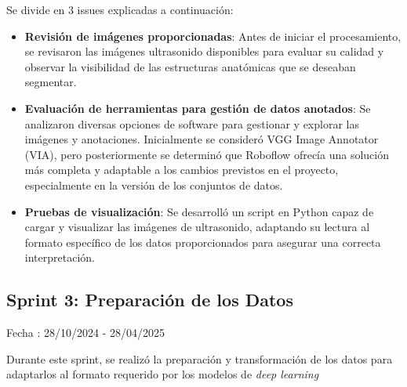 Se divide en 3 issues explicadas a continuación:
\begin{itemize}
    \item \textbf{Revisión de imágenes proporcionadas}: Antes de iniciar el procesamiento, se revisaron las imágenes ultrasonido disponibles para evaluar su calidad y observar la visibilidad de las estructuras anatómicas que se deseaban segmentar.
    \item \textbf{Evaluación de herramientas para gestión de datos anotados}: Se analizaron diversas opciones de software para gestionar y explorar las imágenes y anotaciones. Inicialmente se consideró VGG Image Annotator (VIA), pero posteriormente se determinó que Roboflow ofrecía una solución más completa y adaptable a los cambios previstos en el proyecto, especialmente en la versión de los conjuntos de datos.
    \item \textbf{Pruebas de visualización}: Se desarrolló un script en Python capaz de cargar y visualizar las imágenes de ultrasonido, adaptando su lectura al formato específico de los datos proporcionados para asegurar una correcta interpretación.
\end{itemize}

\subsection{Sprint 3: Preparación de los Datos}

Fecha : 28/10/2024 - 28/04/2025

Durante este sprint, se realizó la preparación y transformación de los datos para adaptarlos al formato requerido por los modelos de \textit{deep learning}

